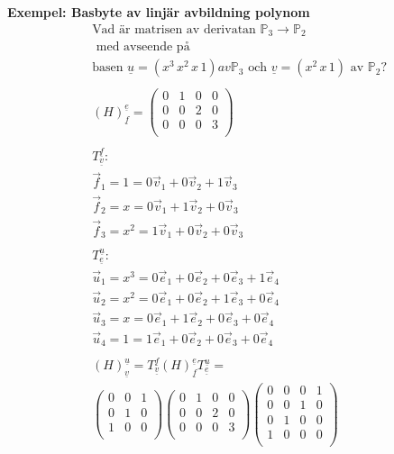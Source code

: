 \begin{multicols}{2}
\textbf{Exempel: Basbyte av linjär avbildning polynom}
\begin{align*}
  &\text{Vad är matrisen av derivatan } \mathbb{P}_3\to\mathbb{P}_2 \\
  &\text{ med avseende på } \\
  &\text{basen } \underline{u} = (x^3 \, x^2 \, x \, 1) av \mathbb{P}_3 \text{ och }
  \underline{v} = (x^2 \, x \, 1)  \text{ av $\mathbb{P}_2$?}\\
  &\\
  &{(H)}^{\underline{e}}_{\underline{f}} =
  \left(\begin{array}{cccc}
    0 & 1 & 0 & 0 \\
    0 & 0 & 2 & 0 \\
    0 & 0 & 0 & 3 \\
  \end{array}\right)  \\
  &\\
  &T^{\underline{f}}_{\underline{v}}: \\
  &\vec{f}_1 = 1   = 0\vec{v}_1 + 0\vec{v}_2 + 1\vec{v}_3 \\
  &\vec{f}_2 = x   = 0\vec{v}_1 + 1\vec{v}_2 + 0\vec{v}_3 \\
  &\vec{f}_3 = x^2 = 1\vec{v}_1 + 0\vec{v}_2 + 0\vec{v}_3 \\
  &\\
  &T^{\underline{u}}_{\underline{e}}: \\
  &\vec{u}_1 = x^3 = 0\vec{e}_1 + 0\vec{e}_2 + 0\vec{e}_3 + 1\vec{e}_4 \\
  &\vec{u}_2 = x^2 = 0\vec{e}_1 + 0\vec{e}_2 + 1\vec{e}_3 + 0\vec{e}_4 \\
  &\vec{u}_3 = x   = 0\vec{e}_1 + 1\vec{e}_2 + 0\vec{e}_3 + 0\vec{e}_4 \\
  &\vec{u}_4 = 1   = 1\vec{e}_1 + 0\vec{e}_2 + 0\vec{e}_3 + 0\vec{e}_4 \\
  &\\
  &{(H)}^{\underline{u}}_{\underline{v}} =
  T^{\underline{f}}_{\underline{v}} {(H)}^{\underline{e}}_{\underline{f}} T^{\underline{u}}_{\underline{e}}= \\
  &\left(\begin{array}{ccc}
    0 & 0 & 1  \\
    0 & 1 & 0  \\
    1 & 0 & 0  \\
  \end{array}\right) 
  \left(\begin{array}{cccc}
    0 & 1 & 0 & 0 \\
    0 & 0 & 2 & 0 \\
    0 & 0 & 0 & 3 \\
  \end{array}\right) 
  \left(\begin{array}{cccc}
    0 & 0 & 0 & 1 \\
    0 & 0 & 1 & 0 \\
    0 & 1 & 0 & 0 \\
    1 & 0 & 0 & 0 \\
  \end{array}\right)  
\end{align*}




\end{multicols}
